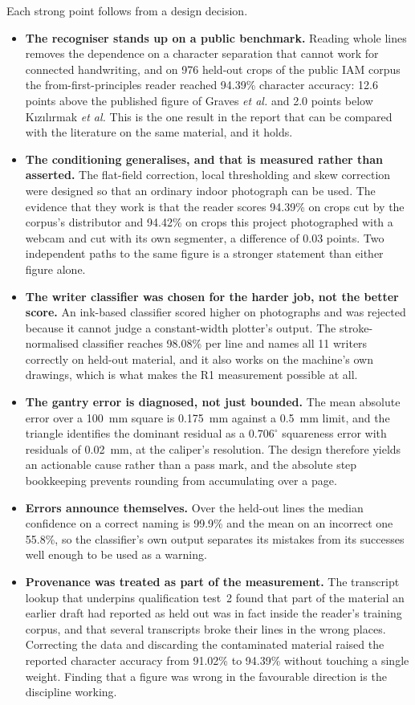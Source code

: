         Each strong point follows from a design decision.
        \begin{itemize}
          \item \textbf{The recogniser stands up on a public benchmark.} Reading whole lines removes the dependence on a character separation that cannot work for connected handwriting, and on 976 held-out crops of the public IAM corpus the from-first-principles reader reached 94.39\% character accuracy: 12.6 points above the published figure of Graves \emph{et al.} and 2.0 points below K{\i}z{\i}l{\i}rmak \emph{et al.} This is the one result in the report that can be compared with the literature on the same material, and it holds.
          \item \textbf{The conditioning generalises, and that is measured rather than asserted.} The flat-field correction, local thresholding and skew correction were designed so that an ordinary indoor photograph can be used. The evidence that they work is that the reader scores 94.39\% on crops cut by the corpus's distributor and 94.42\% on crops this project photographed with a webcam and cut with its own segmenter, a difference of 0.03 points. Two independent paths to the same figure is a stronger statement than either figure alone.
          \item \textbf{The writer classifier was chosen for the harder job, not the better score.} An ink-based classifier scored higher on photographs and was rejected because it cannot judge a constant-width plotter's output. The stroke-normalised classifier reaches 98.08\% per line and names all 11 writers correctly on held-out material, and it also works on the machine's own drawings, which is what makes the R1 measurement possible at all.
          \item \textbf{The gantry error is diagnosed, not just bounded.} The mean absolute error over a 100~mm square is 0.175~mm against a 0.5~mm limit, and the triangle identifies the dominant residual as a $0.706^{\circ}$ squareness error with residuals of 0.02~mm, at the caliper's resolution. The design therefore yields an actionable cause rather than a pass mark, and the absolute step bookkeeping prevents rounding from accumulating over a page.
          \item \textbf{Errors announce themselves.} Over the held-out lines the median confidence on a correct naming is 99.9\% and the mean on an incorrect one 55.8\%, so the classifier's own output separates its mistakes from its successes well enough to be used as a warning.
          \item \textbf{Provenance was treated as part of the measurement.} The transcript lookup that underpins qualification test~2 found that part of the material an earlier draft had reported as held out was in fact inside the reader's training corpus, and that several transcripts broke their lines in the wrong places. Correcting the data and discarding the contaminated material raised the reported character accuracy from 91.02\% to 94.39\% without touching a single weight. Finding that a figure was wrong in the favourable direction is the discipline working.

\end{itemize}
